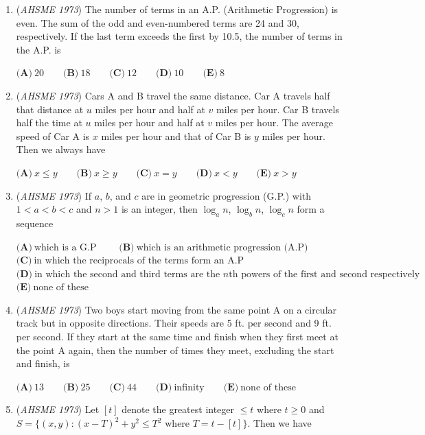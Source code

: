 \begin{enumerate}
 $\textbf{(A)}\ 36\pi-34 \qquad \textbf{(B)}\ 30\pi - 15 \qquad \textbf{(C)}\ 36\pi - 33 \qquad$
$\textbf{(D)}\ 35\pi - 9\sqrt3 \qquad \textbf{(E)}\ 30\pi - 9\sqrt3$


	\item (\textit{AHSME 1973}) The number of terms in an A.P. (Arithmetic Progression) is even. The sum of the odd and even-numbered terms are 24 and 30, respectively. If the last term exceeds the first by 10.5, the number of terms in the A.P. is 


 $\textbf{(A)}\ 20 \qquad \textbf{(B)}\ 18 \qquad \textbf{(C)}\ 12 \qquad \textbf{(D)}\ 10 \qquad \textbf{(E)}\ 8$


	\item (\textit{AHSME 1973}) Cars A and B travel the same distance. Car A travels half that distance at $u$ miles per hour and half at $v$ miles per hour. Car B travels half the time at $u$ miles per hour and half at $v$ miles per hour. The average speed of Car A is $x$ miles per hour and that of Car B is $y$ miles per hour. Then we always have 


 $\textbf{(A)}\ x \leq y\qquad \textbf{(B)}\ x \geq y \qquad \textbf{(C)}\ x=y \qquad \textbf{(D)}\ x<y\qquad \textbf{(E)}\ x>y$


	\item (\textit{AHSME 1973}) If $a$, $b$, and $c$ are in geometric progression (G.P.) with $1 < a < b < c$ and $n>1$ is an integer, then $\log_an$, $\log_bn$, $\log_cn$ form a sequence 


 $\textbf{(A)}\ \text{which is a G.P} \qquad$
$\textbf{(B)}\ \text{which is an arithmetic progression (A.P)} \qquad$
$\textbf{(C)}\ \text{in which the reciprocals of the terms form an A.P} \qquad$
$\textbf{(D)}\ \text{in which the second and third terms are the }n\text{th powers of the first and second respectively} \qquad$
$\textbf{(E)}\ \text{none of these}$


	\item (\textit{AHSME 1973}) Two boys start moving from the same point A on a circular track but in opposite directions. Their speeds are 5 ft. per second and 9 ft. per second. If they start at the same time and finish when they first meet at the point A again, then the number of times they meet, excluding the start and finish, is 


 $\textbf{(A)}\ 13 \qquad \textbf{(B)}\ 25 \qquad \textbf{(C)}\ 44 \qquad \textbf{(D)}\ \text{infinity} \qquad \textbf{(E)}\ \text{none of these}$


	\item (\textit{AHSME 1973}) Let $[t]$ denote the greatest integer $\leq t$ where $t \geq 0$ and $S = \{(x,y): (x-T)^2 + y^2 \leq T^2 \text{ where } T = t - [t]\}$. Then we have 



\end{enumerate}
